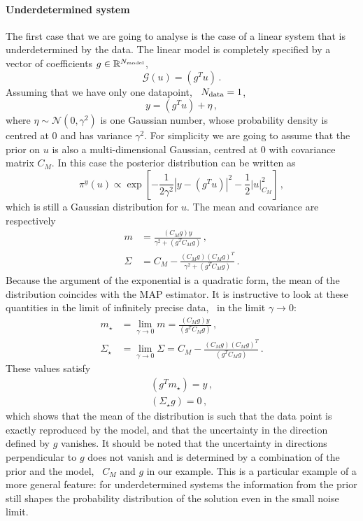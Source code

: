 \paragraph{Underdetermined system}
The first case that we are going to analyse is the case of a linear system that
is underdetermined by the data. The linear model is completely specified by a
vector of coefficients $g\in \mathbb{R}^{N_{\rm model}}$, 
\begin{equation}
  \label{eq:LinSyst}
  \mathcal{G}(u) = \left(g^T u\right)\, .
\end{equation}
Assuming that we have only one datapoint, \ie\ $N_{\rm data}=1$, 
\begin{equation}
  \label{eq:LinearModelEx}
  y = (g^T u) + \eta\, ,
\end{equation}
where $\eta \sim \mathcal{N}(0,\gamma^2)$ is one Gaussian number, whose
probability density is centred at $0$ and has variance $\gamma^2$. For
simplicity we are going to assume that the prior on $u$ is also a
multi-dimensional Gaussian, centred at $0$ with covariance matrix $C_M$. In
this case the posterior distribution can be written as
\begin{equation}
  \label{eq:GaussPostExplicit}
    \pi^y(u) \propto \exp \left[
    -\frac{1}{2\gamma^2} \left|y - (g^T u) \right|^2 - \frac12 \left|
      u
    \right|_{C_M}^2 
    \right]\, ,
\end{equation}
which is still a Gaussian distribution for $u$. The mean and covariance are
respectively
\begin{align}
  m &= \frac{(C_M g) y}{\gamma^2 + (g^T C_M g)}\, , \\
  \Sigma &= C_M - 
  \frac{(C_M g) (C_M g)^T}{\gamma^2 + (g^T C_M g)}\, .
\end{align}
Because the argument of the exponential is a quadratic form, the mean of the
distribution coincides with the MAP estimator. It is instructive to look at
these quantities in the limit of infinitely precise data, \ie\ in the limit
$\gamma\to 0$:
\begin{align}
  m_\star &= 
  \lim_{\gamma\to 0} m
  = \frac{(C_M g) y}{(g^T C_M g)}\, , \\
  \Sigma_\star &= 
  \lim_{\gamma\to 0} \Sigma 
  = C_M - 
  \frac{(C_M g) (C_M g)^T}{(g^T C_M g)}\, .
\end{align}
These values satisfy
\begin{align}
  (g^T m_\star) = y \, , \\
  (\Sigma_\star g) = 0 \, ,
\end{align}
which shows that the mean of the distribution is such that the data point is
exactly reproduced by the model, and that the uncertainty in the direction
defined by $g$ vanishes. It should be noted that the uncertainty in directions
perpendicular to $g$ does not vanish and is determined by a combination of the
prior and the model, \viz\ $C_M$ and $g$ in our example. This is a
particular example of a more general feature: for underdetermined systems the
information from the prior still shapes the probability distribution of the
solution even in the small noise limit.  

